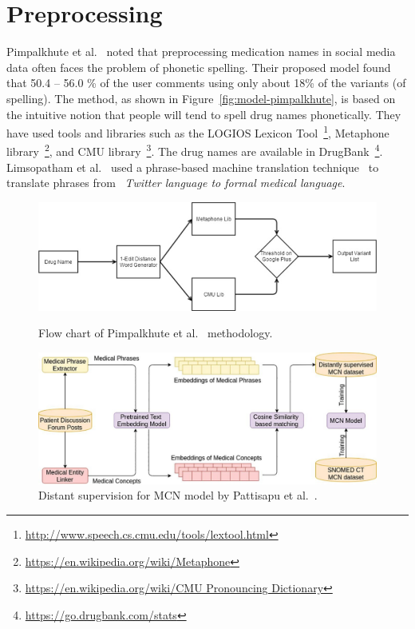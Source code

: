 \section{Preprocessing}

Pimpalkhute et al.~\cite{pimpalkhute2014phonetic} noted that preprocessing medication names in social media data often faces the problem of phonetic spelling. Their proposed model found that 50.4 – 56.0 \% of the user comments using only about 18\% of the variants (of spelling). The method, as shown in Figure~\ref{fig:model-pimpalkhute}, is based on the intuitive notion that people will tend to spell drug names phonetically. They have used tools and libraries such as the LOGIOS Lexicon Tool~\footnote{\url{http://www.speech.cs.cmu.edu/tools/lextool.html}}, Metaphone library~\footnote{\url{https://en.wikipedia.org/wiki/Metaphone}}, and CMU library~\footnote{\url{https://en.wikipedia.org/wiki/CMU Pronouncing Dictionary}}. The drug names are available in DrugBank~\footnote{\url{https://go.drugbank.com/stats}}. Limsopatham et al.~\cite{limsopatham2015adapting} used a phrase-based machine translation technique~\cite{koehn2003statistical} to translate phrases from ~\textit{Twitter language to formal medical language}.

\begin{figure}[h]
	\centering
	\begin{minipage}{0.45\textwidth}
		\includegraphics[width=0.99\linewidth]{Figures/m.png}
		\caption{Flow chart of Pimpalkhute et al.~\cite{pimpalkhute2014phonetic} methodology.}
		\label{fig:model-pimpalkhute}
	\end{minipage}
	\hfill
	\begin{minipage}{0.45\textwidth}
		\includegraphics[width=0.99\linewidth]{Figures/o.jpg}
		\caption{Distant supervision for MCN model by Pattisapu et al.~\cite{PATTISAPU2020103522}.}
		\label{fig:medication-concept-normalization}
	\end{minipage}
\end{figure}

